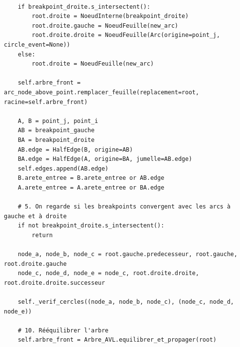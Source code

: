 \begin{frame}[fragile]
\begin{code}
\begin{verbatim}

    if breakpoint_droite.s_intersectent():
        root.droite = NoeudInterne(breakpoint_droite)
        root.droite.gauche = NoeudFeuille(new_arc)
        root.droite.droite = NoeudFeuille(Arc(origine=point_j, circle_event=None))
    else:
        root.droite = NoeudFeuille(new_arc)

    self.arbre_front = arc_node_above_point.remplacer_feuille(replacement=root, racine=self.arbre_front)

    A, B = point_j, point_i
    AB = breakpoint_gauche
    BA = breakpoint_droite
    AB.edge = HalfEdge(B, origine=AB)
    BA.edge = HalfEdge(A, origine=BA, jumelle=AB.edge)
    self.edges.append(AB.edge)
    B.arete_entree = B.arete_entree or AB.edge
    A.arete_entree = A.arete_entree or BA.edge

    # 5. On regarde si les breakpoints convergent avec les arcs à gauche et à droite
    if not breakpoint_droite.s_intersectent():
        return

    node_a, node_b, node_c = root.gauche.predecesseur, root.gauche, root.droite.gauche
    node_c, node_d, node_e = node_c, root.droite.droite, root.droite.droite.successeur

    self._verif_cercles((node_a, node_b, node_c), (node_c, node_d, node_e))

    # 10. Rééquilibrer l'arbre
    self.arbre_front = Arbre_AVL.equilibrer_et_propager(root)
\end{verbatim}
\end{code}
\end{frame}

